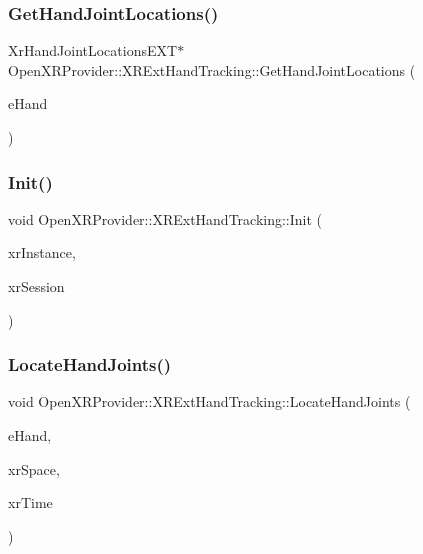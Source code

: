 \subsubsection{\texorpdfstring{GetHandJointLocations()}{GetHandJointLocations()}}
{\footnotesize\ttfamily Xr\+Hand\+Joint\+Locations\+E\+XT$\ast$ Open\+X\+R\+Provider\+::\+X\+R\+Ext\+Hand\+Tracking\+::\+Get\+Hand\+Joint\+Locations (\begin{DoxyParamCaption}\item[{Xr\+Hand\+E\+XT}]{e\+Hand }\end{DoxyParamCaption})\hspace{0.3cm}{\ttfamily [inline]}}

\mbox{\label{class_open_x_r_provider_1_1_x_r_ext_hand_tracking_a6e48f57912a57ed5280dc3e939cc78c4}} 
\subsubsection{\texorpdfstring{Init()}{Init()}}
{\footnotesize\ttfamily void Open\+X\+R\+Provider\+::\+X\+R\+Ext\+Hand\+Tracking\+::\+Init (\begin{DoxyParamCaption}\item[{const Xr\+Instance}]{xr\+Instance,  }\item[{Xr\+Session}]{xr\+Session }\end{DoxyParamCaption})}

\mbox{\label{class_open_x_r_provider_1_1_x_r_ext_hand_tracking_a1bc1b8d8b5dc0d10003c5f93a9f0c041}} 
\subsubsection{\texorpdfstring{LocateHandJoints()}{LocateHandJoints()}}
{\footnotesize\ttfamily void Open\+X\+R\+Provider\+::\+X\+R\+Ext\+Hand\+Tracking\+::\+Locate\+Hand\+Joints (\begin{DoxyParamCaption}\item[{Xr\+Hand\+E\+XT}]{e\+Hand,  }\item[{Xr\+Space}]{xr\+Space,  }\item[{Xr\+Time}]{xr\+Time }\end{DoxyParamCaption})}



